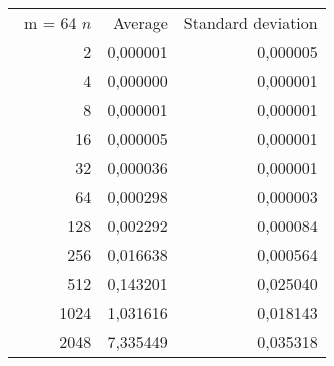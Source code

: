 \begin{tabular}{rrr}\
m = 64
 $n$ & Average & Standard deviation  \\
2 &  0,000001 &  0,000005 \\ 
4 &  0,000000 &  0,000001 \\ 
8 &  0,000001 &  0,000001 \\ 
16 &  0,000005 &  0,000001 \\ 
32 &  0,000036 &  0,000001 \\ 
64 &  0,000298 &  0,000003 \\ 
128 &  0,002292 &  0,000084 \\ 
256 &  0,016638 &  0,000564 \\ 
512 &  0,143201 &  0,025040 \\ 
1024 &  1,031616 &  0,018143 \\ 
2048 &  7,335449 &  0,035318 \\ 
\end{tabular}
